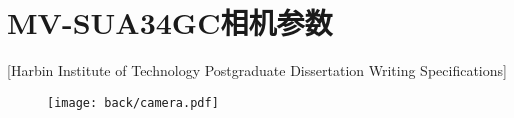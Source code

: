 \chapter[MV-SUA34GC相机参数]{MV-SUA34GC相机参数}[Harbin Institute of Technology Postgraduate Dissertation Writing Specifications]
\begin{figure}[htbp]
    \centering
    \texttt{[image: back/camera.pdf]}
\end{figure}